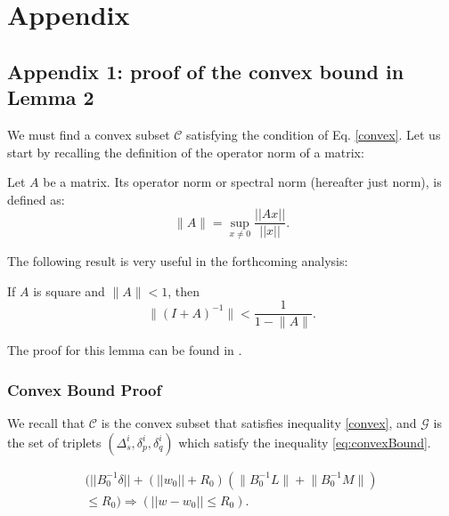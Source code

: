 \chapter{Appendix}
\label{appendix:Appendix}

\section{Appendix 1: proof of the convex bound in Lemma 2}
\label{sec:appendix1}
We must find a convex subset $\mathcal{C}$ satisfying the condition of Eq. \ref{convex}. Let
us start by recalling the definition of the operator norm of a matrix:
\begin{definition}
Let $A$ be a matrix. Its operator norm or
spectral norm (hereafter just norm), is defined as:
\begin{equation}
\Big \| A \Big \| = \sup_{x \neq 0}\frac{||Ax||}{||x||}.
\end{equation}
\end{definition}
The following result is very useful in the forthcoming analysis:
\begin{lemma} \label{lemma:newman}
If $A$ is square and $\Big \| A \Big \| < 1$, then
\begin{equation*}
\Big \| (I+A)^{-1} \Big \| < \frac{1}{1- \Big \|A \Big \|}.
\end{equation*}
\end{lemma}
The proof for this lemma can be found in \cite{gabel2015monitoring}.

\subsection{Convex Bound Proof}
We recall that $\mathcal{C}$ is the convex subset that satisfies
inequality \ref{convex}, and $\mathcal{G}$ is the set of triplets
$(\Delta_s^i, \delta_p^i, \delta_q^i)$
which satisfy the inequality \ref{eq:convexBound}.

\begin{lemma} \label{GinC}
\begin{equation}
\begin{split}
(||B_0^{-1}\delta|| + (||w_0||+R_0)(\Big \|B_0^{-1}L\Big \|+\Big \|B_0^{-1}M\Big \|) \\
 \leq R_0) \Rightarrow (||w-w_0|| \leq R_0).
\end{split}
\end{equation}
\end{lemma}

